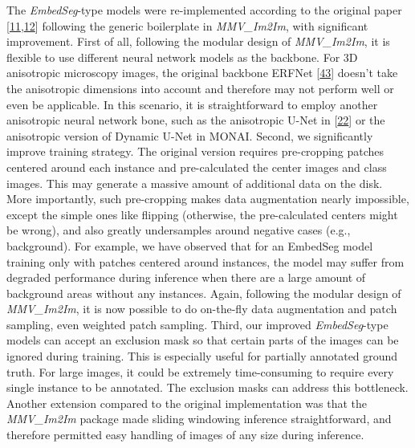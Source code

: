 The \emph{EmbedSeg}-type models were re-implemented according to the original paper {[}\protect\hyperlink{ref-K2ugNcVa}{11},\protect\hyperlink{ref-QmYuUQ5K}{12}{]} following the generic boilerplate in \emph{MMV\_Im2Im}, with significant improvement. First of all, following the modular design of \emph{MMV\_Im2Im}, it is flexible to use different neural network models as the backbone. For 3D anisotropic microscopy images, the original backbone ERFNet {[}\protect\hyperlink{ref-XAkgs3Nh}{43}{]} doesn't take the anisotropic dimensions into account and therefore may not perform well or even be applicable. In this scenario, it is straightforward to employ another anisotropic neural network bone, such as the anisotropic U-Net in {[}\protect\hyperlink{ref-jM3v1UjQ}{22}{]} or the anisotropic version of Dynamic U-Net in MONAI. Second, we significantly improve training strategy. The original version requires pre-cropping patches centered around each instance and pre-calculated the center images and class images. This may generate a massive amount of additional data on the disk. More importantly, such pre-cropping makes data augmentation nearly impossible, except the simple ones like flipping (otherwise, the pre-calculated centers might be wrong), and also greatly undersamples around negative cases (e.g., background). For example, we have observed that for an EmbedSeg model training only with patches centered around instances, the model may suffer from degraded performance during inference when there are a large amount of background areas without any instances. Again, following the modular design of \emph{MMV\_Im2Im}, it is now possible to do on-the-fly data augmentation and patch sampling, even weighted patch sampling. Third, our improved \emph{EmbedSeg}-type models can accept an exclusion mask so that certain parts of the images can be ignored during training. This is especially useful for partially annotated ground truth. For large images, it could be extremely time-consuming to require every single instance to be annotated. The exclusion masks can address this bottleneck. Another extension compared to the original implementation was that the \emph{MMV\_Im2Im} package made sliding windowing inference straightforward, and therefore permitted easy handling of images of any size during inference.

